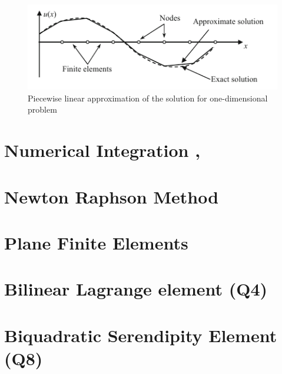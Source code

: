 \begin{figure}[h!]
    \centering
    \includegraphics[scale=0.8]{Figures/Chapter2/Piecewise linear approximation.png}
    \decoRule   
    \caption{Piecewise linear approximation of the solution for one-dimensional problem}
    \label{fig:Piecewise}
\end{figure}

\section{Numerical Integration \parencite{Advance}, \parencite{ref4}}

\section{Newton Raphson Method \parencite{NewtonRapsonBillboard} \parencite{ref4}}

\section{Plane Finite Elements \parencite{ref6}}

\section{Bilinear Lagrange element (Q4) \parencite{LinearStructure}}

\section{Biquadratic Serendipity Element (Q8) \parencite{LinearStructure}}


% 


